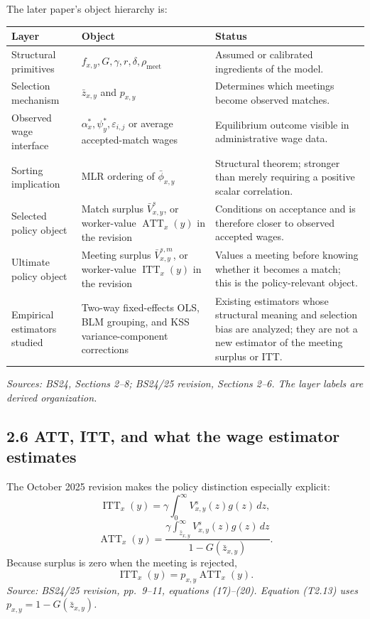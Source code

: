 \documentclass[11pt]{article}
\begin{document}
The later paper's object hierarchy is:

\begin{longtable}{p{}p{}p{}}
\textbf{Layer} & \textbf{Object} & \textbf{Status} \\
\hline
Structural primitives & \(f_{x,y},G,\gamma,r,\delta,\rho_{\mathrm{meet}}\) &
Assumed or calibrated ingredients of the model. \\
Selection mechanism & \(\bar z_{x,y}\) and \(p_{x,y}\) & Determines which
meetings become observed matches. \\
Observed wage interface & \(\alpha_x^*,\psi_y^*,\varepsilon_{i,j}\) or
average accepted-match wages & Equilibrium outcome visible in administrative
wage data. \\
Sorting implication & MLR ordering of \(\bar\phi_{x,y}\) & Structural theorem;
stronger than merely requiring a positive scalar correlation. \\
Selected policy object & Match surplus \(\bar V^s_{x,y}\), or worker-value
\(\operatorname{ATT}_x(y)\) in the revision & Conditions on acceptance and is
therefore closer to observed accepted wages. \\
Ultimate policy object & Meeting surplus \(\bar V^{s,m}_{x,y}\), or
worker-value \(\operatorname{ITT}_x(y)\) in the revision & Values a meeting
before knowing whether it becomes a match; this is the policy-relevant object. \\
Empirical estimators studied & Two-way fixed-effects OLS, BLM grouping, and
KSS variance-component corrections & Existing estimators whose structural
meaning and selection bias are analyzed; they are not a new estimator of the
meeting surplus or ITT. \\
\end{longtable}

\textit{Sources: BS24, Sections 2--8; BS24/25 revision, Sections 2--6.  The
layer labels are derived organization.}

\subsection{2.6 ATT, ITT, and what the wage estimator estimates}

The October 2025 revision makes the policy distinction especially explicit:
\[
\operatorname{ITT}_x(y)
=
\gamma\int_0^\infty V^s_{x,y}(z)g(z)\,dz,
\tag{T2.11}
\]
\[
\operatorname{ATT}_x(y)
=
\frac{
\gamma\int_{\bar z_{x,y}}^\infty
V^s_{x,y}(z)g(z)\,dz
}{
1-G(\bar z_{x,y})
}.
\tag{T2.12}
\]
Because surplus is zero when the meeting is rejected,
\[
\operatorname{ITT}_x(y)
=
p_{x,y}\operatorname{ATT}_x(y).
\tag{T2.13}
\]
\textit{Source: BS24/25 revision, pp.\ 9--11, equations (17)--(20).
Equation (T2.13) uses \(p_{x,y}=1-G(\bar z_{x,y})\).}
\end{document}
